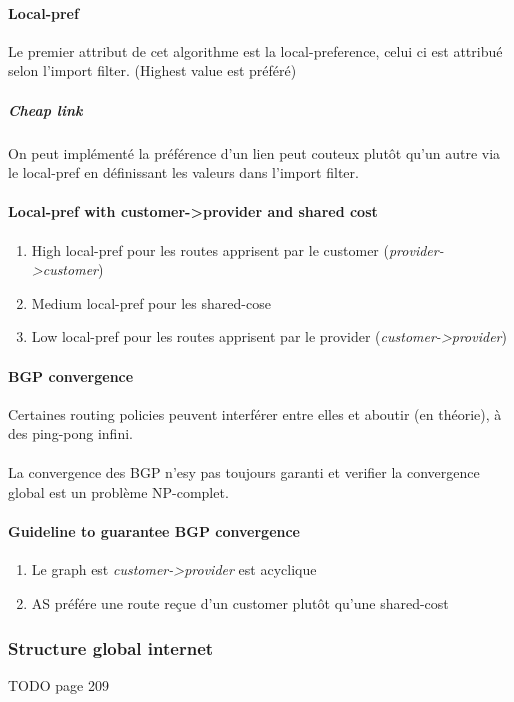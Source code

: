 \paragraph{Local-pref}
Le premier attribut de cet algorithme est la local-preference, celui ci est attribué
selon l'import filter. (Highest value est préféré)

\subparagraph{Cheap link} On peut implémenté la préférence d'un lien peut couteux
plutôt qu'un autre via le local-pref en définissant les valeurs dans l'import filter.


\paragraph{Local-pref with customer->provider and shared cost}
\begin{enumerate}
    \item High local-pref pour les routes apprisent par le customer (\textit{provider->customer})
    \item Medium local-pref pour les shared-cose
    \item Low local-pref pour les routes apprisent par le provider (\textit{customer->provider})
\end{enumerate}


\paragraph{BGP convergence}
Certaines routing policies peuvent interférer entre elles et aboutir (en théorie),
à des ping-pong infini.

\paragraph{ } La convergence des BGP n'esy pas toujours garanti et verifier la
convergence global est un problème NP-complet.

\paragraph{Guideline to guarantee BGP convergence}
\begin{enumerate}
    \item Le graph est \textit{customer->provider} est acyclique
    \item AS préfére une route reçue d'un customer plutôt qu'une shared-cost
\end{enumerate}

\subsubsection{Structure global internet}
TODO page 209

